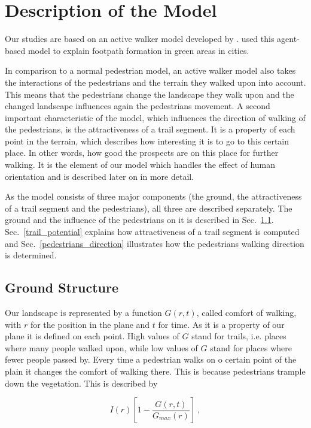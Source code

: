 \section{Description of the Model}

Our studies are based on an active walker model developed by \cite{helbing:1997}. \cite{helbing:1997} used this agent-based model to explain footpath formation in green areas in cities.

In comparison to a normal pedestrian model, an active walker model also takes the interactions of the pedestrians and the terrain they walked upon into account. This means that the pedestrians change the landscape they walk upon and the changed landscape influences again the pedestrians movement. A second important characteristic of the model, which influences the direction of walking of the pedestrians, is the attractiveness of a trail segment. It is a property of each point in the terrain, which describes how interesting it is to go to this certain place. In other words, how good the prospects are on this place for further walking. It is the element of our model which handles the effect of human orientation and is described later on in more detail.

As the model consists of three major components (the ground, the attractiveness of a trail segment and the pedestrians), all three are described separately. The ground and the influence of the pedestrians on it is described in Sec.\ \ref{ground_structure}. Sec.\ \ref{trail_potential} explains how attractiveness of a trail segment is computed and Sec.\ \ref{pedestrians_direction} illustrates how the pedestrians walking direction is determined.

\subsection{Ground Structure}
\label{ground_structure}

Our landscape is represented by a function $G(r,t)$, called comfort of walking, with $r$ for the position in the plane and $t$ for time. As it is a property of our plane it is defined on each point. High values of $G$ stand for trails, i.e. places where many people walked upon, while low values of $G$ stand for places where fewer people passed by. Every time a pedestrian walks on o certain point of the plain it changes the comfort of walking there. This is because pedestrians trample down the vegetation. This is described by

\begin{equation}
\label{trample_down}
I(r)[1-\frac{G(r,t)}{G_{max}(r)}]\ ,
\end{equation}

